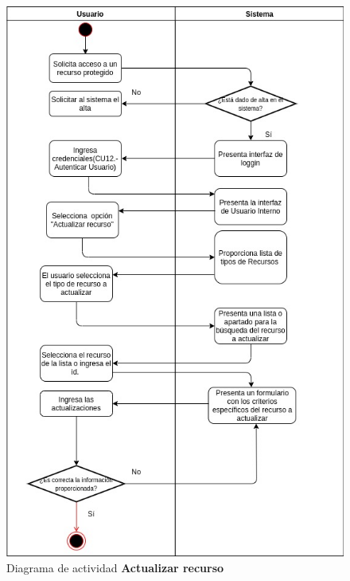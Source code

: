 \pagebreak
\begin{figure}[h]
\centering
\caption{Diagrama de actividad \textbf{Actualizar recurso}}\label{fig:priorReq}
\includegraphics[width=1\textwidth, height=1.5\textwidth]{images/diag_act_actualizar_recurso}
\end{figure}

